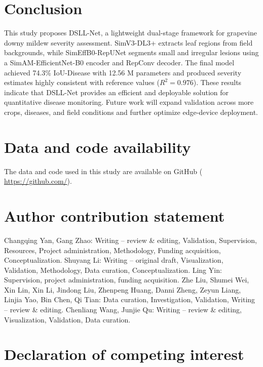 \documentclass[
]{article}
\begin{document}
\hypertarget{conclusion}{%
\section{Conclusion}\label{conclusion}}

This study proposes DSLL-Net, a lightweight dual-stage framework for
grapevine downy mildew severity assessment. SimV3-DL3+ extracts leaf
regions from field backgrounds, while SimEffB0-RepUNet segments small
and irregular lesions using a SimAM-EfficientNet-B0 encoder and RepConv
decoder. The final model achieved 74.3\% IoU-Disease with 12.56 M
parameters and produced severity estimates highly consistent with
reference values (\(R^{2}=0.976\)). These results indicate that DSLL-Net
provides an efficient and deployable solution for quantitative disease
monitoring. Future work will expand validation across more crops,
diseases, and field conditions and further optimize edge-device
deployment.

\hypertarget{data-and-code-availability}{%
\section{Data and code availability}\label{data-and-code-availability}}

The data and code used in this study are available on GitHub (
\href{https://github.com/husnxjsjsb/Grape-Downy}{https://github.com/}).

\hypertarget{author-contribution-statement}{%
\section{Author contribution
statement}\label{author-contribution-statement}}

Changqing Yan, Gang Zhao: Writing -- review \& editing, Validation,
Supervision, Resources, Project administration, Methodology, Funding
acquisition, Conceptualization. Shuyang Li: Writing -- original draft,
Visualization, Validation, Methodology, Data curation,
Conceptualization. Ling Yin: Supervision, project administration,
funding acquisition. Zhe Liu, Shumei Wei, Xin Lin, Xin Li, Jindong Liu,
Zhenpeng Huang, Danni Zheng, Zeyun Liang, Linjia Yao, Bin Chen, Qi Tian:
Data curation, Investigation, Validation, Writing -- review \& editing.
Chenliang Wang, Junjie Qu: Writing -- review \& editing, Visualization,
Validation, Data curation.

\hypertarget{declaration-of-competing-interest}{%
\section{Declaration of competing
interest}\label{declaration-of-competing-interest}}
\end{document}
